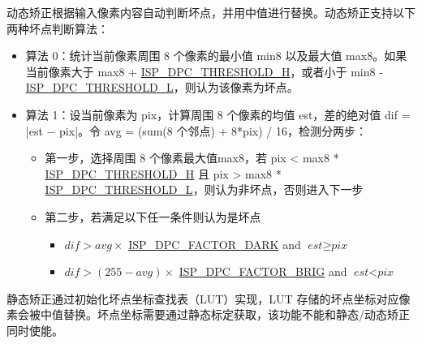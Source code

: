 \documentclass[main\_\_CN.tex]{subfiles}
\begin{document}
动态矫正根据输入像素内容自动判断坏点，并用中值进行替换。动态矫正支持以下两种坏点判断算法：
\begin{itemize}
    \item 算法 0：统计当前像素周围 8 个像素的最小值 min8 以及最大值 max8。如果当前像素大于 max8 + \hyperref[fielddesc:ISPDPCTHRESHOLDH]{ISP\_DPC\_THRESHOLD\_H}，或者小于 min8 - \hyperref[fielddesc:ISPDPCTHRESHOLDL]{ISP\_DPC\_THRESHOLD\_L}，则认为该像素为坏点。
    \item 算法 1：设当前像素为 pix，计算周围 8 个像素的均值 est，差的绝对值 dif = |est − pix|。令 avg = (sum(8 个邻点) + 8*pix) / 16，检测分两步：
    \begin{itemize}
        \item 第一步，选择周围 8 个像素最大值max8，若 pix <  max8 * \hyperref[fielddesc:ISPDPCTHRESHOLDH]{ISP\_DPC\_THRESHOLD\_H} 且 pix > max8 * \hyperref[fielddesc:ISPDPCTHRESHOLDL]{ISP\_DPC\_THRESHOLD\_L}，则认为非坏点，否则进入下一步
        \item 第二步，若满足以下任一条件则认为是坏点
        \begin{itemize}
            \item $\textit{dif} > \textit{avg} \times$ \hyperref[fielddesc:ISPDPCFACTORDARK]{ISP\_DPC\_FACTOR\_DARK} and $\textit{est} \ge \textit{pix}$
            \item $\textit{dif} > (255 - \textit{avg}) \times$ \hyperref[fielddesc:ISPDPCFACTORBRIG]{ISP\_DPC\_FACTOR\_BRIG} and $\textit{est} < \textit{pix}$
        \end{itemize}
    \end{itemize}
\end{itemize}

静态矫正通过初始化坏点坐标查找表（LUT）实现，LUT 存储的坏点坐标对应像素会被中值替换。坏点坐标需要通过静态标定获取，该功能不能和静态/动态矫正同时使能。
\end{document}
